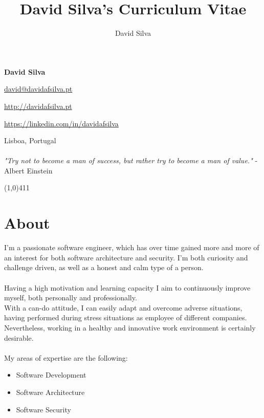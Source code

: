 \documentclass[10pt]{article}
\title{David Silva's Curriculum Vitae}
\author{David Silva}
\newenvironment{listing}{
 \begin{itemize}
  \setlength{\itemsep}{1pt}
  \setlength{\parskip}{0pt}
  \setlength{\parsep}{0pt}
}{\end{itemize}}
\begin{document}
\pagestyle{fancy}
	
\begin{minipage}[ht]{0.46\textwidth}
	\vspace{-5mm}\Huge{\textbf{David Silva}}
\end{minipage}
\begin{minipage}[ht]{0.46\textwidth}
\hfill \href{mailto:david@davidafsilva.pt}{david@davidafsilva.pt}

\hfill \url{http://davidafsilva.pt}

\hfill \url{https://linkedin.com/in/davidafsilva}
\end{minipage}

\begin{minipage}[ht]{0.925\textwidth}
\vspace{-3mm} Lisboa, Portugal\\\\
\vspace{0 mm} \hfill\footnotesize{
    \textit{"Try not to become a man of success, but rather try to become a man of value."} - Albert Einstein
}
\vspace{0.5mm}
\end{minipage}

\line(1,0){411}

\section*{About}
I'm a passionate software engineer, which has over time gained more and more of an interest for both software architecture and security. I'm both curiosity and challenge driven, as well as a honest and calm type of a person.\\\\
Having a high motivation and learning capacity I aim to continuously improve myself, both personally and professionally. \\
With a can-do attitude, I can easily adapt and overcome adverse situations, having performed during stress situations as employee of different companies.
Nevertheless, working in a healthy and innovative work environment is certainly desirable.\\\\
My areas of expertise are the following:
\begin{listing}
	\item Software Development
	\item Software Architecture
	\item Software Security
\end{listing}
\end{document}
